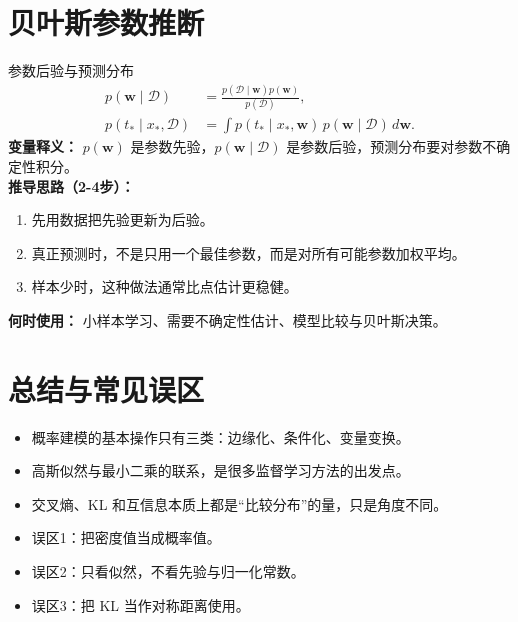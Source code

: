 \documentclass[11pt]{article}
\begin{document}
\section{贝叶斯参数推断}
\begin{formulabox}{参数后验与预测分布}
\begin{align}
p(\mathbf{w}\mid\mathcal{D})
&=\frac{p(\mathcal{D}\mid\mathbf{w})p(\mathbf{w})}{p(\mathcal{D})},\\
p(t_\ast\mid x_\ast,\mathcal{D})
&=\int p(t_\ast\mid x_\ast,\mathbf{w})\,p(\mathbf{w}\mid\mathcal{D})\,d\mathbf{w}.
\end{align}
\textbf{变量释义：} $p(\mathbf{w})$ 是参数先验，$p(\mathbf{w}\mid\mathcal{D})$ 是参数后验，预测分布要对参数不确定性积分。\\
\textbf{推导思路（2-4步）：}
\begin{enumerate}[leftmargin=1.6em]
  \item 先用数据把先验更新为后验。
  \item 真正预测时，不是只用一个最佳参数，而是对所有可能参数加权平均。
  \item 样本少时，这种做法通常比点估计更稳健。
\end{enumerate}
\textbf{何时使用：} 小样本学习、需要不确定性估计、模型比较与贝叶斯决策。
\end{formulabox}

\section{总结与常见误区}
\begin{itemize}[leftmargin=1.6em]
  \item 概率建模的基本操作只有三类：边缘化、条件化、变量变换。
  \item 高斯似然与最小二乘的联系，是很多监督学习方法的出发点。
  \item 交叉熵、KL 和互信息本质上都是“比较分布”的量，只是角度不同。
  \item 误区1：把密度值当成概率值。
  \item 误区2：只看似然，不看先验与归一化常数。
  \item 误区3：把 KL 当作对称距离使用。
\end{itemize}
\end{document}

